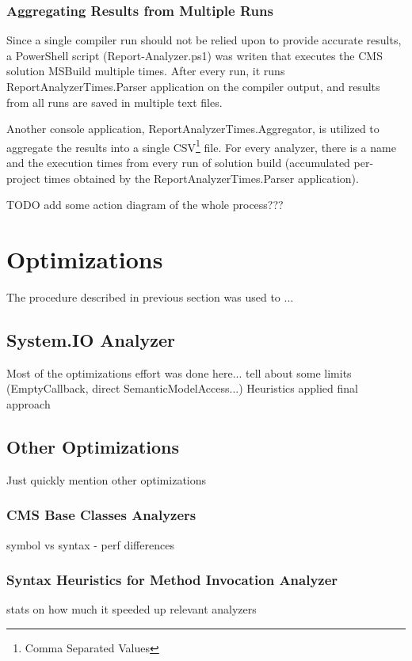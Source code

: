 \documentclass[
  digital, %
  table,   %
  lof,     %
  lot,     %
  oneside,
]{fithesis3}
\begin{document}
\subsubsection{Aggregating Results from Multiple Runs}
Since a single compiler run should not be relied upon to provide accurate results, a PowerShell script (Report-Analyzer.ps1) was writen that executes the CMS solution MSBuild multiple times. After every run, it runs ReportAnalyzerTimes.Parser application on the compiler output, and results from all runs are saved in multiple text files. 

Another console application, ReportAnalyzerTimes.Aggregator, is utilized to aggregate the results into a single CSV\footnote{Comma Separated Values} file. For every analyzer, there is a name and the execution times from every run of solution build (accumulated per-project times obtained by the ReportAnalyzerTimes.Parser application).

TODO add some action diagram of the whole process???

\section{Optimizations}
The procedure described in previous section was used to ...

\subsection{System.IO Analyzer}
Most of the optimizations effort was done here...
tell about some limits (EmptyCallback, direct SemanticModelAccess...)
Heuristics applied
final approach

\subsection{Other Optimizations}
Just quickly mention other optimizations 

\subsubsection{CMS Base Classes Analyzers}
symbol vs syntax - perf differences

\subsubsection{Syntax Heuristics for Method Invocation Analyzer}
stats on how much it speeded up relevant analyzers
\end{document}
